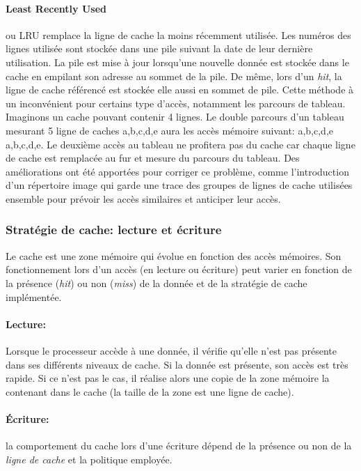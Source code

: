 \paragraph{Least Recently Used} ou LRU remplace la ligne de cache la moins récemment utilisée. Les numéros des lignes utilisée sont stockée dans une pile suivant la date de leur dernière utilisation. La pile est mise à jour lorsqu'une nouvelle donnée est stockée dans le cache en empilant son adresse au sommet de la pile. De même, lors d'un \textit{hit}, la ligne de cache référencé est stockée elle aussi en sommet de pile. Cette méthode à un inconvénient pour certains type d'accès, notamment les parcours de tableau. Imaginons un cache pouvant contenir 4 lignes. Le double parcours d'un tableau mesurant 5 ligne de caches a,b,c,d,e aura les accès mémoire suivant: a,b,c,d,e a,b,c,d,e. Le deuxième accès au tableau ne profitera pas du cache car chaque ligne de cache est remplacée au fur et mesure du parcours du tableau. Des améliorations ont été apportées pour corriger ce problème, comme l'introduction d'un répertoire image \cite{Stone:1987:HCA:31845} qui garde une trace des groupes de lignes de cache utilisées ensemble pour prévoir les accès similaires et anticiper leur accès.






\subsubsection{Stratégie de cache: lecture et écriture}

Le cache est une zone mémoire qui évolue en fonction des accès mémoires. Son fonctionnement lors d'un accès (en lecture ou écriture) peut varier en fonction de la présence (\textit{hit}) ou non (\textit{miss}) de la donnée et de la stratégie de cache implémentée.

\paragraph{Lecture:}  Lorsque le processeur accède à une donnée, il vérifie qu'elle n'est pas présente dans ses différents niveaux de cache. Si la donnée est présente, son accès est très rapide. Si ce n'est pas le cas, il réalise alors une copie de la zone mémoire la contenant dans le cache (la taille de la zone est une ligne de cache).


\paragraph{Écriture:} la comportement du cache lors d'une écriture dépend de la présence ou non de la \textit{ligne de cache} et la politique employée.


